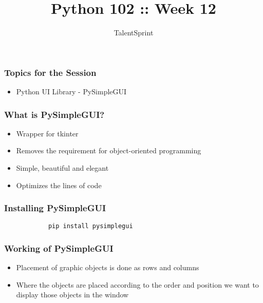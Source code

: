 \documentclass[14pt]{beamer}
\title{Python 102 :: Week 12}
\date{}
\author[TS]{TalentSprint}
\begin{document}
    \begin{frame}
        \titlepage
    \end{frame}
    \begin{frame}
        \frametitle{Topics for the Session}
        \begin{itemize}
            \item Python UI Library - PySimpleGUI
        \end{itemize}
    \end{frame}
    \begin{frame}
        \frametitle{What is PySimpleGUI?}
        \begin{itemize}
            \item Wrapper for tkinter
            \item Removes the requirement for object-oriented programming
            \item Simple, beautiful and elegant
            \item Optimizes the lines of code
        \end{itemize}
    \end{frame}
    \begin{frame}[containsverbatim]
        \frametitle{Installing PySimpleGUI}
        \begin{lstlisting}
            pip install pysimplegui
        \end{lstlisting}
    \end{frame}
    \begin{frame}
        \frametitle{Working of PySimpleGUI}
        \begin{itemize}
            \item Placement of graphic objects is done as rows and columns
            \item Where the objects are placed according to the order and 
            position we want to display those objects in the window
        \end{itemize}
    \end{frame}
\end{document}
